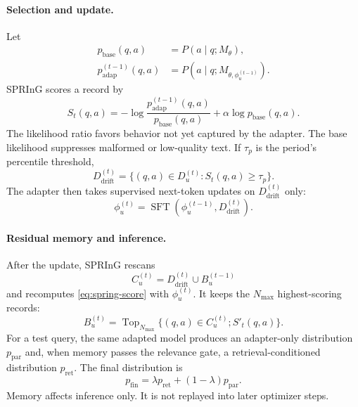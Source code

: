 \paragraph{Selection and update.}
Let
\begin{align}
  p_{\mathrm{base}}(q,a)
  &=P(a\mid q;M_\theta),\\
  p_{\mathrm{adap}}^{(t-1)}(q,a)
  &=P(a\mid q;M_{\theta,\phi_u^{(t-1)}}).
\end{align}
SPRInG scores a record by
\begin{equation}
  S_t(q,a)
  =
  -\log\frac{p_{\mathrm{adap}}^{(t-1)}(q,a)}
                  {p_{\mathrm{base}}(q,a)}
  +\alpha\log p_{\mathrm{base}}(q,a).
  \label{eq:spring-score}
\end{equation}
The likelihood ratio favors behavior not yet captured by the adapter.  The
base likelihood suppresses malformed or low-quality text.  If $\tau_p$ is
the period's percentile threshold,
\begin{equation}
  D_{\mathrm{drift}}^{(t)}
  =
  \{(q,a)\in D_u^{(t)}:S_t(q,a)\ge\tau_p\}.
  \label{eq:spring-drift}
\end{equation}
The adapter then takes supervised next-token updates on
$D_{\mathrm{drift}}^{(t)}$ only:
\begin{equation}
  \phi_u^{(t)}
  =
  \operatorname{SFT}
  \left(\phi_u^{(t-1)},D_{\mathrm{drift}}^{(t)}\right).
  \label{eq:spring-update}
\end{equation}

\paragraph{Residual memory and inference.}
After the update, SPRInG rescans
\begin{equation}
  C_u^{(t)}
  =
  D_{\mathrm{drift}}^{(t)}\cup B_u^{(t-1)}
\end{equation}
and recomputes \cref{eq:spring-score} with $\phi_u^{(t)}$.  It keeps the
$N_{\max}$ highest-scoring records:
\begin{equation}
  B_u^{(t)}
  =
  \operatorname{Top}_{N_{\max}}
  \{(q,a)\in C_u^{(t)};S'_t(q,a)\}.
  \label{eq:spring-buffer}
\end{equation}
For a test query, the same adapted model produces an adapter-only
distribution $p_{\mathrm{par}}$ and, when memory passes the relevance gate, a
retrieval-conditioned distribution $p_{\mathrm{ret}}$.  The final
distribution is
\begin{equation}
  p_{\mathrm{fin}}
  =
  \lambda p_{\mathrm{ret}}+(1-\lambda)p_{\mathrm{par}}.
  \label{eq:spring-interpolation}
\end{equation}
Memory affects inference only.  It is not replayed into later optimizer
steps.

